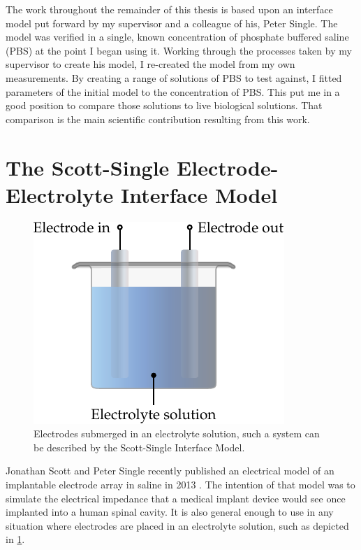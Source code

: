 
The work throughout the remainder of this thesis is based upon an interface model put forward by my supervisor and a colleague of his, Peter Single.
The model was verified in a single, known concentration of phosphate buffered saline (PBS) at the point I began using it.
Working through the processes taken by my supervisor to create his model, I re-created the model from my own measurements.
By creating a range of solutions of PBS to test against, I fitted parameters of the initial model to the concentration of PBS.
This put me in a good position to compare those solutions to live biological solutions.
That comparison is the main scientific contribution resulting from this work.


\section{The Scott-Single Electrode-Electrolyte Interface Model}


  \begin{figure}
    \centering
    \includegraphics{content/pt2/07-InterfaceModel/graphics/electrode-electrolyte}
    \caption{\label{fig:electrode-electrolyte}Electrodes submerged in an electrolyte solution, such a system can be described by the Scott-Single Interface Model.}
  \end{figure}

  Jonathan Scott and Peter Single recently published an electrical model of an implantable electrode array in saline in 2013 \cite{ScottSingle2013}.
  The intention of that model was to simulate the electrical impedance that a medical implant device would see once implanted into a human spinal cavity.
  It is also general enough to use in any situation where electrodes are placed in an electrolyte solution, such as depicted in \cref{fig:electrode-electrolyte}.

